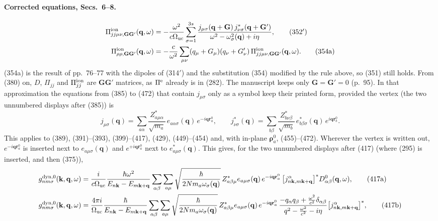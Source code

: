 \paragraph{Corrected equations, Secs.~6--8.}
\begin{align}
\Pi^{\rm ion}_{jj\mu\nu,\mathbf G\mathbf G'}(\mathbf q,\omega)&=-\frac{\omega^2}{c\Omega_{\rm uc}}\sum_{\sigma=1}^{3s}\frac{j_{\mu\sigma}(\mathbf q+\mathbf G)\,j^*_{\nu\sigma}(\mathbf q+\mathbf G')}{\omega^2-\omega^2_\sigma(\mathbf q)+i\eta},\tag{352$'$}\\
\Pi^{\rm ion}_{\rho\rho,\mathbf G\mathbf G'}(\mathbf q,\omega)&=-\frac{c}{\omega^2}\sum_{\mu\nu}(q_\mu+G_\mu)(q_\nu+G'_\nu)\,\Pi^{\rm ion}_{jj\mu\nu,\mathbf G\mathbf G'}(\mathbf q,\omega).\tag{354a}
\end{align}
(354a) is the result of pp.~76--77 with the dipoles of (314$'$) and the substitution (354) modified by the rule above, so (351) still holds. From (380) on, $D$, $\Pi_{jj}$ and $\Pi^{\rm ion}_{jj}$ are $\mathbf G\mathbf G'$ matrices, as $\Pi^{\rm e}$ already is in (282). The manuscript keeps only $\mathbf G=\mathbf G'=0$ (p.~95). In that approximation the equations from (385) to (472) that contain $j_{\mu\sigma}$ only as a symbol keep their printed form, provided the vertex (the two unnumbered displays after (385)) is
\begin{equation}
j_{\mu\sigma}(\mathbf q)=\sum_{a\alpha}\frac{Z^*_{a\mu\alpha}}{\sqrt{m_a}}\,e_{a\alpha\sigma}(\mathbf q)\,e^{-i\mathbf q\mathbf r^0_a},\qquad
j^*_{\nu\sigma}(\mathbf q)=\sum_{b\beta}\frac{Z^*_{b\nu\beta}}{\sqrt{m_b}}\,e^*_{b\beta\sigma}(\mathbf q)\,e^{i\mathbf q\mathbf r^0_b}.\tag{385$'$}
\end{equation}
This applies to (389), (391)--(393), (399)--(417), (429), (449)--(454) and, with in-plane $\boldsymbol\rho^0_a$, (455)--(472). Wherever the vertex is written out, $e^{-i\mathbf q\mathbf r^0_a}$ is inserted next to $e_{a\mu\sigma}(\mathbf q)$ and $e^{+i\mathbf q\mathbf r^0_a}$ next to $e^*_{a\mu\sigma}(\mathbf q)$. This gives, for the two unnumbered displays after (417) (where (295) is inserted, and then (375)),
\begin{align}
g^{\rm dyn,0}_{nm\sigma}(\mathbf k,\mathbf q,\omega)&=\frac{i}{c\Omega_{\rm uc}}\frac{\hbar\omega^2}{E_{n\mathbf k}-E_{m\mathbf k+\mathbf q}}\sum_{\alpha\beta}\sum_{a\mu}\sqrt{\frac{\hbar}{2Nm_a\omega_\sigma(\mathbf q)}}\,Z^*_{a\beta\mu}e_{a\mu\sigma}(\mathbf q)\,e^{-i\mathbf q\mathbf r^0_a}\,\big[j^\alpha_{n\mathbf k,m\mathbf k+\mathbf q}\big]^*D^0_{\alpha\beta}(\mathbf q,\omega),\tag{417a}\\
g^{\rm dyn,0}_{nm\sigma}(\mathbf k,\mathbf q,\omega)&=\frac{4\pi i}{\Omega_{\rm uc}}\frac{\hbar}{E_{n\mathbf k}-E_{m\mathbf k+\mathbf q}}\sum_{\alpha\beta}\sum_{a\mu}\sqrt{\frac{\hbar}{2Nm_a\omega_\sigma(\mathbf q)}}\,Z^*_{a\beta\mu}e_{a\mu\sigma}(\mathbf q)\,e^{-i\mathbf q\mathbf r^0_a}\,\frac{-q_\alpha q_\beta+\frac{\omega^2}{c^2}\delta_{\alpha\beta}}{q^2-\frac{\omega^2}{c^2}-i\eta}\big[j^\alpha_{n\mathbf k,m\mathbf k+\mathbf q}\big]^*,\tag{417b}
\end{align}
